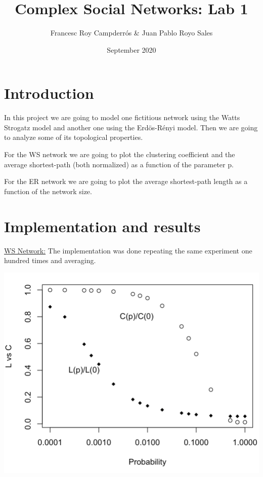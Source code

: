 \documentclass{article}
\title{Complex Social Networks: Lab 1}
\author{Francesc Roy Campderrós \& Juan Pablo Royo Sales}
\date{September 2020}
\begin{document}
\maketitle
\newpage

\section{Introduction}

\noindent In this project we are going to model one fictitious network using the Watts Strogatz model and another one using the Erdös-Rényi model. Then we are going to analyze some of its topological properties.\newline

\noindent For the WS network we are going to plot  the  clustering  coefficient  and  the  average shortest-path (both normalized) as a function of the parameter p.\newline

\noindent For the ER network we are going to plot the  average  shortest-path  length  as  a  function  of  the  network  size.\newline

\section{Implementation and results}

\noindent \underline{WS Network:} The implementation was done repeating the same experiment one hundred times and averaging. \newline

\begin{center}
    

\includegraphics[scale=0.5]{img1.png}\newline
\end{center}
\end{document}
